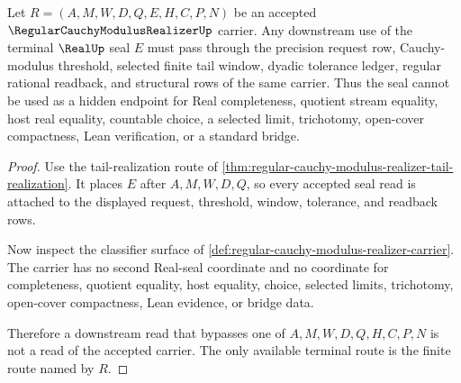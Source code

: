 \begin{theorem}
\label{thm:regular-cauchy-modulus-realizer-nonescape}
Let $R=(A,M,W,D,Q,E,H,C,P,N)$ be an accepted $\RegularCauchyModulusRealizerUp$ carrier. Any downstream use of the terminal $\RealUp$ seal $E$ must pass through the precision request row, Cauchy-modulus threshold, selected finite tail window, dyadic tolerance ledger, regular rational readback, and structural rows of the same carrier. Thus the seal cannot be used as a hidden endpoint for Real completeness, quotient stream equality, host real equality, countable choice, a selected limit, trichotomy, open-cover compactness, Lean verification, or a standard bridge.
\end{theorem}
\begin{proof}
Use the tail-realization route of \autoref{thm:regular-cauchy-modulus-realizer-tail-realization}. It places $E$ after $A,M,W,D,Q$, so every accepted seal read is attached to the displayed request, threshold, window, tolerance, and readback rows.

Now inspect the classifier surface of \autoref{def:regular-cauchy-modulus-realizer-carrier}. The carrier has no second Real-seal coordinate and no coordinate for completeness, quotient equality, host equality, choice, selected limits, trichotomy, open-cover compactness, Lean evidence, or bridge data.

Therefore a downstream read that bypasses one of $A,M,W,D,Q,H,C,P,N$ is not a read of the accepted carrier. The only available terminal route is the finite route named by $R$.
\end{proof}




